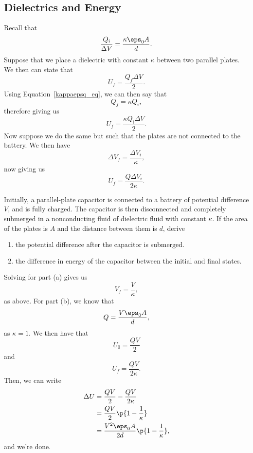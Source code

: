 \documentclass[11pt]{article}
\begin{document}
\subsection{Dielectrics and Energy}
Recall that
\begin{equation}
    \frac{Q_i}{\Delta V} = \frac{\kappa\eps_0 A}{d}.\label{kappaepsq_eq}
\end{equation}
Suppose that we place a dielectric with constant $\kappa$ between two parallel plates. We then can state that
\[U_f = \frac{Q_f\Delta V}{2}.\]
Using Equation~\ref{kappaepsq_eq}, we can then say that
\[Q_f = \kappa Q_i,\]
therefore giving us
\begin{equation}
    U_f = \frac{\kappa Q_i\Delta V}{2}.
\end{equation}
Now suppose we do the same but such that the plates are not connected to the battery. We then have
\[\Delta V_f = \frac{\Delta V_i}{\kappa},\]
now giving us
\begin{equation}
    U_f = \frac{Q\Delta V_i}{2\kappa}.
\end{equation}
\begin{example}
    Initially, a parallel-plate capacitor is connected to a battery of potential difference $V$, and is fully charged. The capacitor is then disconnected and completely submerged in a nonconducting fluid of dielectric fluid with constant $\kappa$. If the area of the plates is $A$ and the distance between them is $d$, derive
    \begin{enumerate}[label=(\alph*)]
        \item the potential difference after the capacitor is submerged.
        \item the difference in energy of the capacitor between the initial and final states.
    \end{enumerate}
\end{example}
\begin{solution}
    Solving for part (a) gives us
    \[V_f = \boxed{\frac{V}{\kappa}},\]
    as above. For part (b), we know that
    \[Q = \frac{V\eps_0 A}{d},\]
    as $\kappa = 1$. We then have that
    \[U_0 = \frac{QV}{2}\]
    and \[U_f = \frac{QV}{2\kappa}.\]
    Then, we can write
    \begin{align*}
        \Delta U &= \frac{QV}{2} - \frac{QV}{2\kappa} \\
        &= \frac{QV}{2}\p{1-\frac{1}{\kappa}} \\
        &= \frac{V^2\eps_0 A}{2d}\p{1 - \frac{1}{\kappa}},    
    \end{align*}
    and we're done.
\end{solution}
\end{document}
